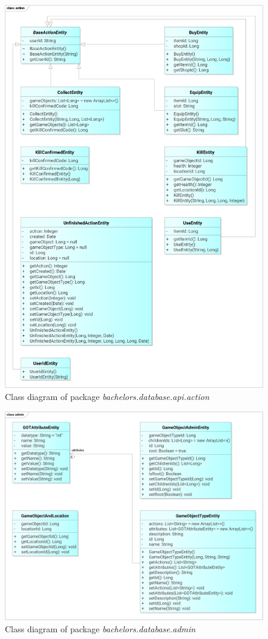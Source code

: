 \begin{figure}[h]	
	\includegraphics[width=\textwidth]{figures/classdiagrams/dsaction}
	\centering			
	\caption{Class diagram of package \textit{bachelors.database.api.action}}
\end{figure}

\begin{figure}[h]	
	\includegraphics[width=\textwidth]{figures/classdiagrams/dsadmin}
	\centering			
	\caption{Class diagram of package \textit{bachelors.database.admin}}
\end{figure}

